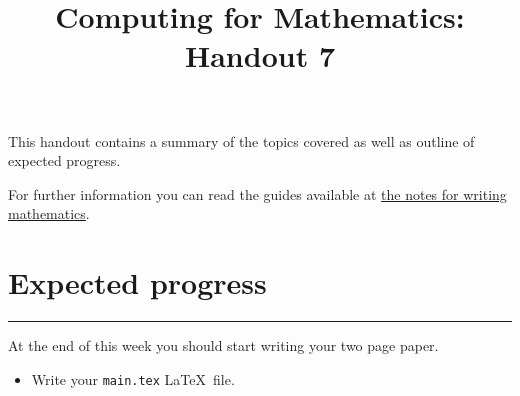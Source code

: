 \documentclass{article}
\title{Computing for Mathematics: Handout 7}
\date{}
\begin{document}
\maketitle


This handout contains a summary of the topics covered as well as outline of
expected progress.

For further information you can read the guides available at
\href{https://vknight.org/tex/}{the notes for writing mathematics}.

\section{Expected progress}
\hrule

At the end of this week you should start writing your two page paper.

\begin{itemize}
    \item Write your \texttt{main.tex} \LaTeX\ file.
\end{itemize}

\begin{center}
\end{center}
\end{document}
